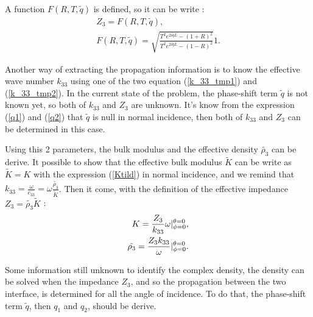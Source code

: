 \documentclass{article}
\begin{document}
    A function $F(R,T,\tilde{q})$ is defined, so it can be write :
    \begin{align}
        Z_3=F(R,T,\tilde{q}),\\
        F(R,T,\tilde{q})=\sqrt{\frac{T^2e^{2i\tilde{q}L}-(1+R)^2}{T^2e^{2i\tilde{q}L}-(1-R)^2}}1.
    \end{align}
    
    Another way of extracting the propagation information is to know the effective wave number $k_{33}$ using one of the two equation (\ref{k_33_tmp1}) and (\ref{k_33_tmp2}).
    In the current state of the problem, the phase-shift term $\tilde{q}$ is not known yet, so both of $k_{33}$ and $Z_3$ are unknown. It's know from the expression (\ref{q1}) and (\ref{q2}) that $\tilde{q}$ is null in normal incidence, then both of $k_{33}$ and $Z_3$ can be determined in this case. 
    
    Using this 2 parameters, the bulk modulus and the effective density $\tilde{\rho_3}$ can be derive. It possible to show that the effective bulk modulus $\tilde{K}$ can be write as $\tilde{K}=K$ with the expression (\ref{Ktild}) in normal incidence, and we remind that $k_{33}=\frac{\omega}{c_{33}}=\omega\frac{\tilde{\rho_3}}{\tilde{K}}$. Then it come, with the definition of the effective impedance $Z_3=\tilde{\rho_3}\tilde{K}$ :
    \begin{align}
        K=\frac{Z_3}{k_{33}}\omega\Large{|}^{\theta=0}_{\phi=0},\\
        \tilde{\rho_3}=\frac{Z_3k_{33}}{\omega}\Large{|}^{\theta=0}_{\phi=0}.
    \end{align}
    
    Some information still unknown to identify the complex density, the density can be solved when the impedance $Z_3$, and so the propagation between the two interface, is determined for all the angle of incidence. To do that, the phase-shift term $\tilde{q}$, then $q_1$ and $q_2$, should be derive. 
    
\end{document}

